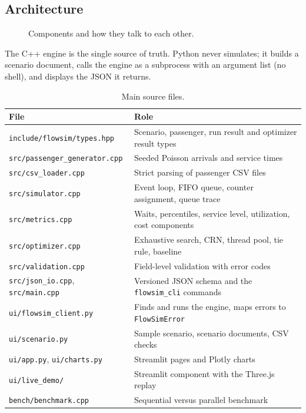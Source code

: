 \documentclass[11pt,a4paper]{article}
\newcommand{\code}[1]{\texttt{#1}}
\begin{document}
\subsection{Architecture}
\begin{figure}[H]\centering\archdiagram\caption{Components and how they talk to each other.}\end{figure}

The C++ engine is the single source of truth. Python never simulates; it builds a scenario document, calls the engine
as a subprocess with an argument list (no shell), and displays the JSON it returns.

\begin{table}[H]\centering\small
\begin{tabularx}{\textwidth}{@{}l L@{}}
\toprule
File & Role \\
\midrule
\code{include/flowsim/types.hpp} & Scenario, passenger, run result and optimizer result types \\
\code{src/passenger\_generator.cpp} & Seeded Poisson arrivals and service times \\
\code{src/csv\_loader.cpp} & Strict parsing of passenger CSV files \\
\code{src/simulator.cpp} & Event loop, FIFO queue, counter assignment, queue trace \\
\code{src/metrics.cpp} & Waits, percentiles, service level, utilization, cost components \\
\code{src/optimizer.cpp} & Exhaustive search, CRN, thread pool, tie rule, baseline \\
\code{src/validation.cpp} & Field-level validation with error codes \\
\code{src/json\_io.cpp}, \code{src/main.cpp} & Versioned JSON schema and the \code{flowsim\_cli} commands \\
\code{ui/flowsim\_client.py} & Finds and runs the engine, maps errors to \code{FlowSimError} \\
\code{ui/scenario.py} & Sample scenario, scenario documents, CSV checks \\
\code{ui/app.py}, \code{ui/charts.py} & Streamlit pages and Plotly charts \\
\code{ui/live\_demo/} & Streamlit component with the Three.js replay \\
\code{bench/benchmark.cpp} & Sequential versus parallel benchmark \\
\bottomrule
\end{tabularx}
\caption{Main source files.}
\end{table}
\end{document}
